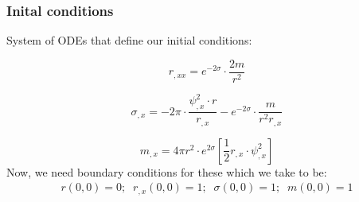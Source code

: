 \documentclass[hyperref={bookmarks=false},aspectratio=169]{beamer}
\begin{document}
\begin{frame}
    \frametitle{Inital conditions}

    System of ODEs that define our initial conditions:

    \begin{equation}
        r_{, x x}=e^{-2 \sigma} \cdot \frac{2 m}{r^{2}}
        \label{eqn:r_chap3}
    \end{equation}


    \begin{equation}
        \sigma_{, x}= -2 \pi \cdot  \frac{\psi_{, x}^{2} \cdot r}{r_{,x}}- e^{-2 \sigma} \cdot \frac{ m}{r^{2}r_{, x}}
        \label{eqn:sigma_chap3}
    \end{equation}

    \begin{equation}
        m_{, x}=4 \pi r^{2} \cdot e^{2 \sigma}\left[\frac{1}{2} r_{, x} \cdot \psi_{, x}^{2} \right]
    \end{equation}
    Now, we need boundary conditions for these which we take to be:
    \begin{eqnarray*}
        r(0 ,0) = 0  ;\;\;
        r_{,x}(0 ,0) = 1  ;\;\;
        \sigma(0 ,0) = 1  ;\;\;
        m(0 ,0) = 1
    \end{eqnarray*}

\end{frame}



\end{document}
